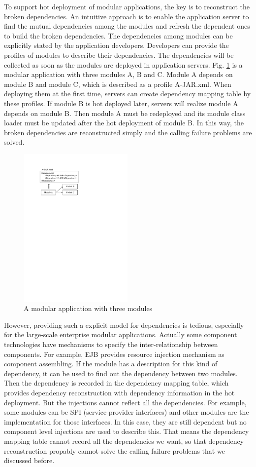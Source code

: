 \documentclass[conference]{IEEEtran}
\begin{document}
To support hot deployment of modular applications, the key is to reconstruct the broken dependencies. An intuitive approach is to enable the application server to find the mutual dependencies among the modules and refresh the dependent ones to build the broken dependencies. The dependencies among modules can be explicitly stated by the application developers. Developers can provide the profiles of modules to describe their dependencies. The dependencies will be collected as soon as the modules are deployed in application servers. Fig. \ref{fig:example_abc} is a modular application with three modules A, B and C. Module A depends on module B and module C, which is described as a profile A-JAR.xml. When deploying them at the first time, servers can create dependency mapping table by these profiles. If module B is hot deployed later, servers will realize module A depends on module B. Then module A must be redeployed and its module class loader must be updated after the hot deployment of module B. In this way, the broken dependencies are reconstructed simply and the calling failure problems are solved.

\begin{figure}[ht]
\centering
\includegraphics[width=2.2in]{ExampleThree.pdf}
\caption{A modular application with three modules}
\label{fig:example_abc}
\end{figure}


However, providing such a explicit model for dependencies is tedious, especially for the large-scale enterprise modular applications. Actually some component technologies have mechanisms to specify the inter-relationship between components. For example, EJB provides resource injection mechanism\cite{DI} as component assembling. If the module has a description for this kind of dependency, it can be used to find out the dependency between two modules. Then the dependency is recorded in the dependency mapping table, which provides dependency reconstruction with dependency information in the hot deployment. But the injections cannot reflect all the dependencies. For example, some modules can be SPI (service provider interfaces) and other modules are the implementation for those interfaces. In this case, they are still dependent but no component level injections are used to describe this. That means the dependency mapping table cannot record all the dependencies we want, so that dependency reconstruction propably cannot solve the calling failure problems that we discussed before.
\end{document}
